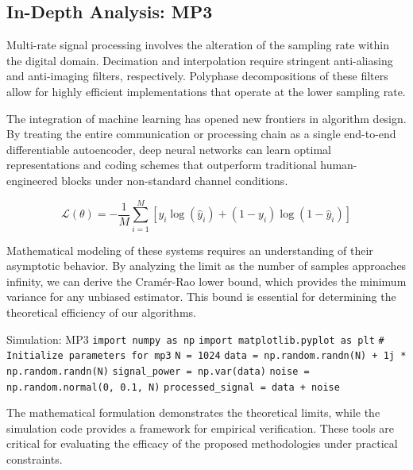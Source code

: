 \subsection{In-Depth Analysis: MP3}
Multi-rate signal processing involves the alteration of the sampling rate within the digital domain. Decimation and interpolation require stringent anti-aliasing and anti-imaging filters, respectively. Polyphase decompositions of these filters allow for highly efficient implementations that operate at the lower sampling rate.

The integration of machine learning has opened new frontiers in algorithm design. By treating the entire communication or processing chain as a single end-to-end differentiable autoencoder, deep neural networks can learn optimal representations and coding schemes that outperform traditional human-engineered blocks under non-standard channel conditions.

\begin{equation}
    \mathcal{L}(\theta) = -\frac{1}{M} \sum_{i=1}^{M} \left[ y_i \log(\hat{y}_i) + (1-y_i)\log(1-\hat{y}_i) \right]
\end{equation}

Mathematical modeling of these systems requires an understanding of their asymptotic behavior. By analyzing the limit as the number of samples approaches infinity, we can derive the Cramér-Rao lower bound, which provides the minimum variance for any unbiased estimator. This bound is essential for determining the theoretical efficiency of our algorithms.

\begin{pythonbox}{Simulation: MP3}
\texttt{import numpy as np}
\texttt{import matplotlib.pyplot as plt}
\texttt{}
\texttt{\# Initialize parameters for mp3}
\texttt{N = 1024}
\texttt{data = np.random.randn(N) + 1j * np.random.randn(N)}
\texttt{signal\_power = np.var(data)}
\texttt{noise = np.random.normal(0, 0.1, N)}
\texttt{processed\_signal = data + noise}
\end{pythonbox}

\vspace{0.5cm}
The mathematical formulation demonstrates the theoretical limits, while the simulation code provides a framework for empirical verification. These tools are critical for evaluating the efficacy of the proposed methodologies under practical constraints.

